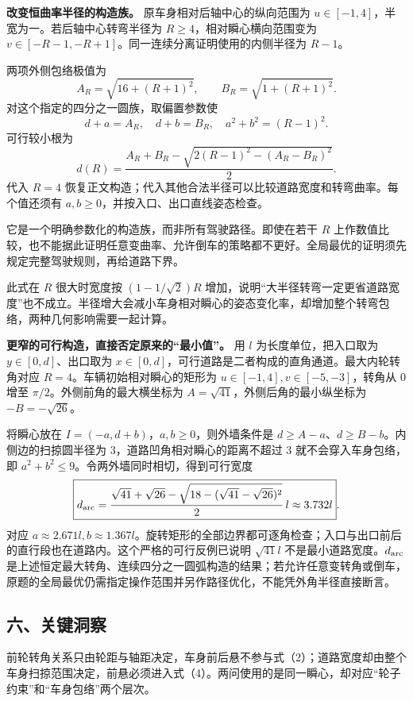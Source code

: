 \documentclass[12pt,a4paper,UTF8]{ctexart}
\begin{document}
\textbf{改变恒曲率半径的构造族。} 原车身相对后轴中心的纵向范围为
\(u\in[-1,4]\)，半宽为一。若后轴中心转弯半径为
\(R\ge4\)，相对瞬心横向范围变为
\(v\in[-R-1,-R+1]\)。同一连续分离证明使用的内侧半径为 \(R-1\)。

两项外侧包络极值为 \[
A_R=\sqrt{16+(R+1)^2},
\qquad B_R=\sqrt{1+(R+1)^2}.
\] 对这个指定的四分之一圆族，取偏置参数使 \[
d+a=A_R,\quad d+b=B_R,\quad a^2+b^2=(R-1)^2.
\] 可行较小根为 \[
d(R)=\frac{A_R+B_R-\sqrt{2(R-1)^2-(A_R-B_R)^2}}2.
\] 代入 \(R=4\)
恢复正文构造；代入其他合法半径可以比较道路宽度和转弯曲率。每个值还须有
\(a,b\ge0\)，并按入口、出口直线姿态检查。

它是一个明确参数化的构造族，而非所有驾驶路径。即使在若干 \(R\)
上作数值比较，也不能据此证明任意变曲率、允许倒车的策略都不更好。全局最优的证明须先规定完整驾驶规则，再给道路下界。

此式在 \(R\) 很大时宽度按 \((1-1/\sqrt2)R\)
增加，说明``大半径转弯一定更省道路宽度''也不成立。半径增大会减小车身相对瞬心的姿态变化率，却增加整个转弯包络，两种几何影响需要一起计算。

\textbf{更窄的可行构造，直接否定原来的``最小值''。} 用 \(l\)
为长度单位，把入口取为 \(y\in[0,d]\)、出口取为
\(x\in[0,d]\)，可行道路是二者构成的直角通道。最大内轮转角对应
\(R=4\)。车辆初始相对瞬心的矩形为 \(u\in[-1,4],v\in[-5,-3]\)，转角从
\(0\) 增至 \(\pi/2\)。外侧前角的最大横坐标为
\(A=\sqrt{41}\)，外侧后角的最小纵坐标为 \(-B=-\sqrt{26}\)。

将瞬心放在 \(I=(-a,d+b)\)，\(a,b\ge0\)，则外墙条件是
\(d\ge A-a\)、\(d\ge B-b\)。内侧边的扫掠圆半径为
\(3\)，道路凹角相对瞬心的距离不超过 \(3\) 就不会穿入车身包络，即
\(a^2+b^2\le9\)。令两外墙同时相切，得到可行宽度 \[
\boxed{d_{\rm arc}=
\frac{\sqrt{41}+\sqrt{26}-
\sqrt{18-(\sqrt{41}-\sqrt{26})^2}}2\,l
\approx3.732l}.
\] 对应
\(a\approx2.671l,b\approx1.367l\)。旋转矩形的全部边界都可逐角检查；入口与出口前后的直行段也在道路内。这个严格的可行反例已说明
\(\sqrt{41}l\) 不是最小道路宽度。\(d_{\rm arc}\)
是上述恒定最大转角、连续四分之一圆弧构造的结果；若允许任意变转角或倒车，原题的全局最优仍需指定操作范围并另作路径优化，不能凭外角半径直接断言。

\subsection{六、关键洞察}\label{ux516dux5173ux952eux6d1eux5bdf}

前轮转角关系只由轮距与轴距决定，车身前后悬不参与式（2）；道路宽度却由整个车身扫掠范围决定，前悬必须进入式（4）。两问使用的是同一瞬心，却对应``轮子约束''和``车身包络''两个层次。
\end{document}
